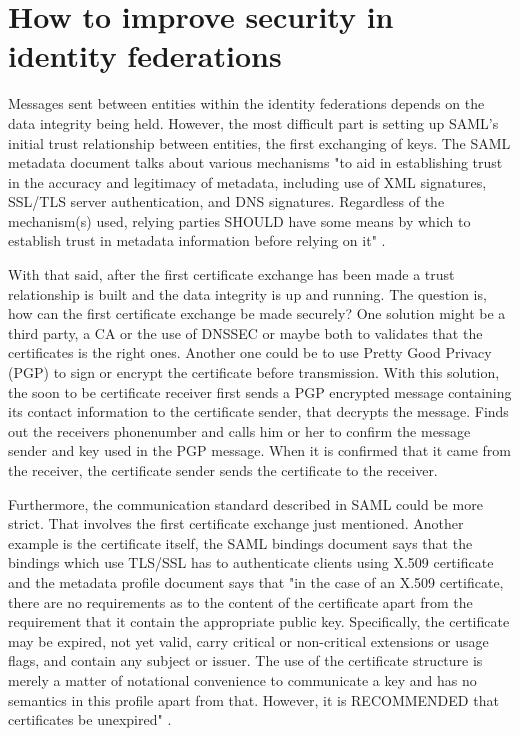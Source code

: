\section{How to improve security in identity federations}

Messages sent between entities within the identity federations depends on the data integrity being held.
However, the most difficult part is setting up SAML's initial trust relationship between entities, the first exchanging of keys.
The SAML metadata document talks about various mechanisms "to aid in establishing trust in the accuracy and legitimacy of metadata,
including use of XML signatures, SSL/TLS server authentication, and DNS signatures.
Regardless of the mechanism(s) used, relying parties SHOULD have some means by which to establish trust in metadata information
before relying on it" \cite[p.~29]{pdf:oasis-open-metadata}.

With that said, after the first certificate exchange has been made a trust relationship is built and the data integrity is up and running. 
The question is, how can the first certificate exchange be made securely? 
One solution might be a third party, a CA or the use of DNSSEC or maybe both to validates that the certificates is the right ones.
Another one could be to use Pretty Good Privacy (PGP)  \cite{rfc:2440} to sign or encrypt the certificate before transmission.
With this solution, the soon to be certificate receiver first sends a PGP encrypted message containing its contact
information to the certificate sender, that decrypts the message. Finds out the receivers phonenumber and calls him or her
to confirm the message sender and key used in the PGP message.
When it is confirmed that it came from the receiver, the certificate sender sends the certificate to the receiver.

Furthermore, the communication standard described in SAML could be more strict.
That involves the first certificate exchange just mentioned. 
Another example is the certificate itself, the SAML bindings document says  
that the bindings which use TLS/SSL has to authenticate clients using X.509 certificate \cite[p.~8]{pdf:oasis-open-bindings} and the metadata profile document says that 
"in the case of an X.509 certificate, there are no requirements as to the content of the certificate apart from the requirement 
that it contain the appropriate public key. 
Specifically, the certificate may be expired, not yet valid, carry critical or non-critical extensions or usage flags, and contain 
any subject or issuer. 
The use of the certificate structure is merely a matter of notational convenience to communicate a key and has no semantics in this 
profile apart from that. 
However, it is RECOMMENDED that certificates be unexpired" \cite[p.~11]{pdf:oasis-open-metadata-profile}. 

